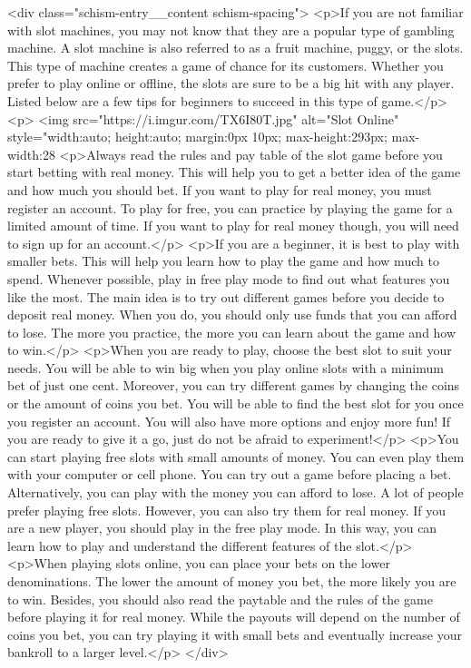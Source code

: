 {		<div class="schism-entry__content schism-spacing">			<p>If you are not familiar with slot machines, you may not know that they are a popular type of gambling machine. A slot machine is also referred to as a fruit machine, puggy, or the slots. This type of machine creates a game of chance for its customers. Whether you prefer to play online or offline, the slots are sure to be a big hit with any player. Listed below are a few tips for beginners to succeed in this type of game.</p>
<p> <img src="https://i.imgur.com/TX6I80T.jpg" alt="Slot Online" style="width:auto; height:auto; margin:0px 10px; max-height:293px; max-width:28%
<p>Always read the rules and pay table of the slot game before you start betting with real money. This will help you to get a better idea of the game and how much you should bet. If you want to play for real money, you must register an account. To play for free, you can practice by playing the game for a limited amount of time. If you want to play for real money though, you will need to sign up for an account.</p>
<p>If you are a beginner, it is best to play with smaller bets. This will help you learn how to play the game and how much to spend. Whenever possible, play in free play mode to find out what features you like the most. The main idea is to try out different games before you decide to deposit real money. When you do, you should only use funds that you can afford to lose. The more you practice, the more you can learn about the game and how to win.</p>
<p>When you are ready to play, choose the best slot to suit your needs. You will be able to win big when you play online slots with a minimum bet of just one cent. Moreover, you can try different games by changing the coins or the amount of coins you bet. You will be able to find the best slot for you once you register an account. You will also have more options and enjoy more fun! If you are ready to give it a go, just do not be afraid to experiment!</p>
<p>You can start playing free slots with small amounts of money. You can even play them with your computer or cell phone. You can try out a game before placing a bet. Alternatively, you can play with the money you can afford to lose. A lot of people prefer playing free slots. However, you can also try them for real money. If you are a new player, you should play in the free play mode. In this way, you can learn how to play and understand the different features of the slot.</p>
<p>When playing slots online, you can place your bets on the lower denominations. The lower the amount of money you bet, the more likely you are to win. Besides, you should also read the paytable and the rules of the game before playing it for real money. While the payouts will depend on the number of coins you bet, you can try playing it with small bets and eventually increase your bankroll to a larger level.</p>
		</div>

}
